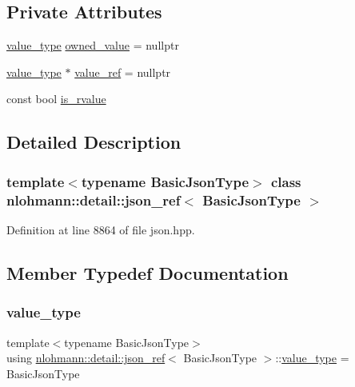 \subsection*{Private Attributes}
\begin{DoxyCompactItemize}
\item 
\hyperlink{classnlohmann_1_1detail_1_1json__ref_a78d76cf288141049568c0d670ed670ef}{value\+\_\+type} \hyperlink{classnlohmann_1_1detail_1_1json__ref_a5d7bd67a5ab713d9be1e248cf9d509cd}{owned\+\_\+value} = nullptr
\item 
\hyperlink{classnlohmann_1_1detail_1_1json__ref_a78d76cf288141049568c0d670ed670ef}{value\+\_\+type} $\ast$ \hyperlink{classnlohmann_1_1detail_1_1json__ref_a23504615c2076070d5e087443bb376a4}{value\+\_\+ref} = nullptr
\item 
const bool \hyperlink{classnlohmann_1_1detail_1_1json__ref_a434d1e18c21cc1b61954ba22b62ee7a5}{is\+\_\+rvalue}
\end{DoxyCompactItemize}


\subsection{Detailed Description}
\subsubsection*{template$<$typename Basic\+Json\+Type$>$\newline
class nlohmann\+::detail\+::json\+\_\+ref$<$ Basic\+Json\+Type $>$}



Definition at line 8864 of file json.\+hpp.



\subsection{Member Typedef Documentation}
\mbox{\label{classnlohmann_1_1detail_1_1json__ref_a78d76cf288141049568c0d670ed670ef}} 
\subsubsection{\texorpdfstring{value\+\_\+type}{value\_type}}
{\footnotesize\ttfamily template$<$typename Basic\+Json\+Type$>$ \\
using \hyperlink{classnlohmann_1_1detail_1_1json__ref}{nlohmann\+::detail\+::json\+\_\+ref}$<$ Basic\+Json\+Type $>$\+::\hyperlink{classnlohmann_1_1detail_1_1json__ref_a78d76cf288141049568c0d670ed670ef}{value\+\_\+type} =  Basic\+Json\+Type}



